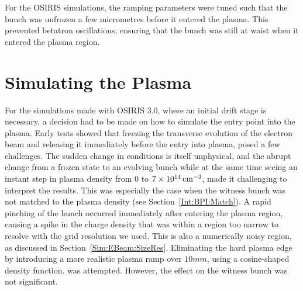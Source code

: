 For the OSIRIS simulations, the ramping parameters were tuned such that the bunch was unfrozen a few micrometres before it entered the plasma.
This prevented betatron oscillations, ensuring that the bunch was still at waist when it entered the plasma region.

\section{Simulating the Plasma}
\label{Sim:Plasma}

For the simulations made with OSIRIS 3.0, where an initial drift stage is necessary, a decision had to be made on how to simulate the entry point into the plasma.
Early tests showed that freezing the transverse evolution of the electron beam and releasing it immediately before the entry into plasma, posed a few challenges.
The sudden change in conditions is itself unphysical, and the abrupt change from a frozen state to an evolving bunch while at the same time seeing an instant step in plasma density from $0$ to $7\times 10^{14}\,\mathrm{cm}^{-3}$, made it challenging to interpret the results.
This was especially the case when the witness bunch was not matched to the plasma density (see Section~\ref{Int:BPI:Match}).
A rapid pinching of the bunch occurred immediately after entering the plasma region, causing a spike in the charge density that was within a region too narrow to resolve with the grid resolution we used.
This is also a numerically noisy region, as discussed in Section~\ref{Sim:EBeam:SizeRes}.
Eliminating the hard plasma edge by introducing a more realistic plasma ramp over $10\unit{mm}$, using a cosine-shaped density function. was attempted.
However, the effect on the witness bunch was not significant.


